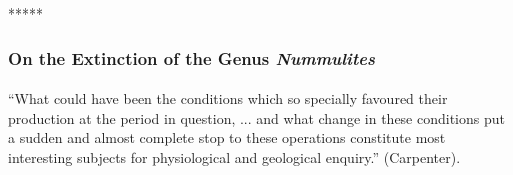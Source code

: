 \documentclass[a4paper, 12pt, oneside]{article}
\begin{document}
\centerline{*\hspace{15mm}*\hspace{15mm}*\hspace{15mm}*\hspace{15mm}*}
\bigskip

\subsubsection{On the Extinction of the Genus \emph{Nummulites}}
\paragraph{}
``What could have been the conditions which so specially favoured their production at the period in question, ... and what change in these conditions put a sudden and almost complete stop to these operations constitute most interesting subjects for physiological and geological enquiry.'' (Carpenter).
\end{document}
